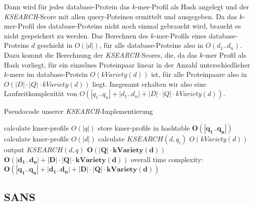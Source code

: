 \documentclass{article}
\begin{document}
Dann wird für jedes database-Protein das $k$-mer-Profil als Hash angelegt und der \emph{KSEARCH}-Score mit allen query-Poteinen ermittelt und ausgegeben. Da das $k$-mer-Profil des database-Proteins nicht noch einmal gebraucht wird, braucht es nicht gespeichert zu werden. Das Berechnen des $k$-mer-Profils eines database-Proteins $d$ geschieht in $O(|d|)$, für alle database-Proteine also in $O(d_1..d_n)$. Dazu kommt die Berechnung der \emph{KSEARCH}-Scores, die, da das $k$-mer Profil als Hash vorliegt, für ein einzelnes Proteinpaar linear in der Anzahl unterschiedlicher $k$-mere im database-Protein $O(kVariety(d))$ ist, für alle Proteinpaare also in $O(|D| \cdot |Q| \cdot kVariety(d))$ liegt. Insgesamt erhalten wir also eine Laufzeitkomplexität von $O(|q_1..q_n|+|d_1..d_n|+|D| \cdot |Q| \cdot kVariety(d))$.



\begin{algorithm}
  \caption{Pseudocode unserer \emph{KSEARCH}-Implementierung}
\begin{algorithmic}
      \State calculate kmer-profile \Comment $O(|q|)$
      \State store kmer-profile in hashtable
    \EndFor \Comment $\mathbf{O(|q_1..q_n|)}$
      \State calculate kmer-profile \Comment $O(|d|)$
        \State calculate $KSEARCH(d,q_{i})$ \Comment $O(kVariety(d))$   
        \State output $KSEARCH(d,q)$
      \EndFor \Comment $\mathbf{O(|Q| \cdot kVariety(d))}$
    \EndFor   \Comment $\mathbf{O(|d_1..d_n|+|D| \cdot |Q| \cdot kVariety(d))}$  
  \EndFunction \Comment overall time complexity: $\mathbf{O(|q_1..q_n|+|d_1..d_n|+|D| \cdot |Q| \cdot kVariety(d))}$
\end{algorithmic}
\end{algorithm}

\subsection{SANS}
\label{sans}
\end{document}

